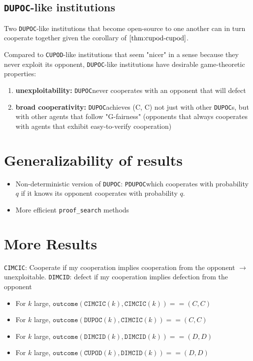 \documentclass{article}
\newcommand{\dupoc}{\texttt{DUPOC}}
\newcommand{\cupod}{\texttt{CUPOD}}
\newcommand{\cimcic}{\texttt{CIMCIC}}
\newcommand{\dimcid}{\texttt{DIMCID}}
\begin{document}
\subsection{\texttt{DUPOC}-like institutions}
Two \texttt{DUPOC}-like institutions that become open-source to one another can in turn cooperate together given the corollary of $\cref{thm:cupod-cupod}$.

Compared to \texttt{CUPOD}-like institutions that seem "nicer" in a sense because they never exploit its opponent, \texttt{DUPOC}-like institutions have desirable game-theoretic properties: \begin{enumerate}
    \item \textbf{unexploitability:} \dupoc never cooperates with an opponent that will defect
    \item \textbf{broad cooperativity:} \dupoc achieves (C, C) not just with other \dupoc s, but with other agents that follow "G-fairness" (opponents that always cooperates with agents that exhibit easy-to-verify cooperation)
\end{enumerate}

\section{Generalizability of results}
\begin{itemize}
    \item Non-deterministic version of \dupoc: \texttt{P}\dupoc which cooperates with probability $q$ if it knows its opponent cooperates with probability $q$.
    \item More efficient \texttt{proof\_search} methods
\end{itemize}

\section{More Results}
\cimcic: Cooperate if my cooperation implies cooperation from the opponent
$\to$ unexploitable.
\dimcid: defect if my cooperation implies defection from the opponent

\begin{theorem}
    \begin{itemize}
        \item For $k$ large, $\texttt{outcome}(\cimcic(k),\cimcic(k)) == (C,C)$
        \item For $k$ large, $\texttt{outcome}(\dupoc(k),\cimcic(k)) == (C,C)$
    \end{itemize}
\end{theorem}
\begin{theorem}
    \begin{itemize}
        \item For $k$ large, $\texttt{outcome}(\dimcid(k),\dimcid(k)) == (D,D)$
        \item For $k$ large, $\texttt{outcome}(\cupod(k),\dimcid(k)) == (D,D)$
    \end{itemize}
\end{theorem}
\end{document}
